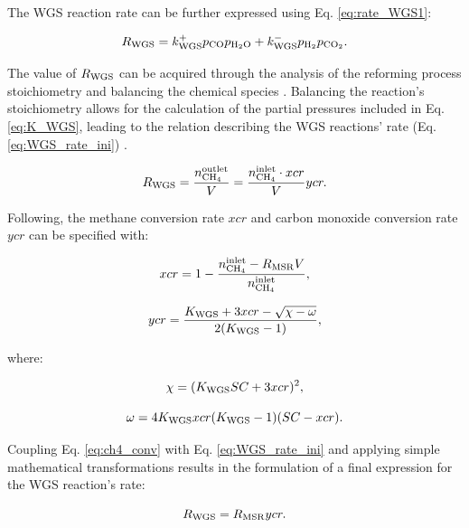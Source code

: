 \documentclass[preprint,12pt]{elsarticle}
\begin{document}
The WGS reaction rate can be further expressed using Eq. \eqref{eq:rate_WGS1}:

\begin{equation}
\label{eq:rate_WGS1}
R_{\rm{WGS}} = k_{\rm{WGS}}^+ p_{\rm{CO}}p_{\rm{H_2O}} + k_{\rm{WGS}}^- p_{\rm{H_2}}p_{\rm{CO_2}}.
\end{equation}

The value of $R_{\rm{WGS}}$ can be acquired through the analysis of the reforming process stoichiometry and balancing the chemical species \cite{Brus2014, Wolf2021}.  Balancing the reaction's stoichiometry allows for the calculation of the partial pressures included in Eq. \eqref{eq:K_WGS}, leading to the relation describing the WGS reactions' rate (Eq. \eqref{eq:WGS_rate_ini}) \cite{Brus2012}.

\begin{equation}
\label{eq:WGS_rate_ini}
R_{\rm{WGS}} = \frac{n^{\rm{outlet}}_{\rm{CH_4}}}{V} = \frac{n^{\rm{inlet}}_{\rm{CH_4}} \cdot xcr}{V} ycr.
\end{equation}

\vspace{3mm}

 Following, the methane conversion rate $xcr$ and carbon monoxide conversion rate $ycr$ can be specified with:

\begin{equation}
\label{eq:ch4_conv}
xcr = 1 - \frac{n^{\rm{inlet}}_{\rm{CH_4}} - R_{\rm{MSR}}V}{n^{\rm{inlet}}_{\rm{CH_4}}},
\end{equation}

\begin{equation}
\label{eq:co_conv}
ycr = \frac{K_{\rm{WGS}} + 3xcr - \sqrt{\chi - \omega}}{2(K_{\rm{WGS}} - 1)},
\end{equation}

\noindent where:

\begin{equation}
\chi = (K_{\rm{WGS}}SC+3xcr)^2,
\end{equation}

\begin{equation}
\omega = 4K_{\rm{WGS}}xcr(K_{\rm{WGS}} - 1)(SC - xcr).
\end{equation}

Coupling Eq. \eqref{eq:ch4_conv} with Eq. \eqref{eq:WGS_rate_ini} and applying simple mathematical transformations results in the formulation of a final expression for the WGS reaction's rate:

\begin{equation}
\label{eq:rate_WGS}
R_{\rm{WGS}} = R_{\rm{MSR}}ycr.
\end{equation}
\end{document}
